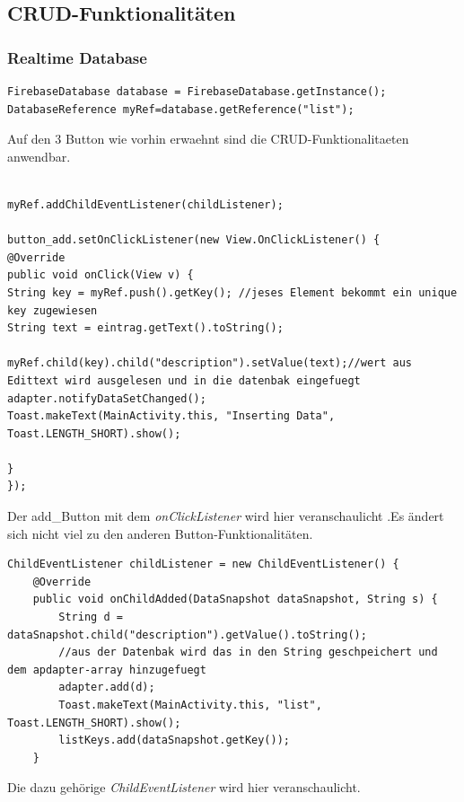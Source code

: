 \subsection{CRUD-Funktionalitäten}
\subsubsection{Realtime Database}
\begin{lstlisting}[style=Java ,caption={datenbank Instanz und Referenz}]
FirebaseDatabase database = FirebaseDatabase.getInstance();
DatabaseReference myRef=database.getReference("list");
\end{lstlisting}


Auf den 3 Button wie vorhin erwaehnt sind die CRUD-Funktionalitaeten anwendbar.
\begin{lstlisting}[style=Java,caption={Button Listener fuer den Add_Button}]

myRef.addChildEventListener(childListener);

button_add.setOnClickListener(new View.OnClickListener() {
@Override
public void onClick(View v) {
String key = myRef.push().getKey(); //jeses Element bekommt ein unique key zugewiesen
String text = eintrag.getText().toString();

myRef.child(key).child("description").setValue(text);//wert aus Edittext wird ausgelesen und in die datenbak eingefuegt
adapter.notifyDataSetChanged();
Toast.makeText(MainActivity.this, "Inserting Data", Toast.LENGTH_SHORT).show();

}
});

\end{lstlisting}


Der add\_Button mit dem \textit{onClickListener} wird hier veranschaulicht .Es ändert sich nicht viel zu den anderen Button-Funktionalitäten.
\begin{lstlisting}[style=Java,caption={childeventListener für das einfuegen in das Adapter-array für die Anzeige}]
ChildEventListener childListener = new ChildEventListener() {
	@Override
	public void onChildAdded(DataSnapshot dataSnapshot, String s) {
		String d = dataSnapshot.child("description").getValue().toString();
		//aus der Datenbak wird das in den String geschpeichert und dem apdapter-array hinzugefuegt
		adapter.add(d);
		Toast.makeText(MainActivity.this, "list", Toast.LENGTH_SHORT).show();
		listKeys.add(dataSnapshot.getKey());
	}
\end{lstlisting}
Die dazu gehörige \textit{ChildEventListener} wird hier veranschaulicht.


